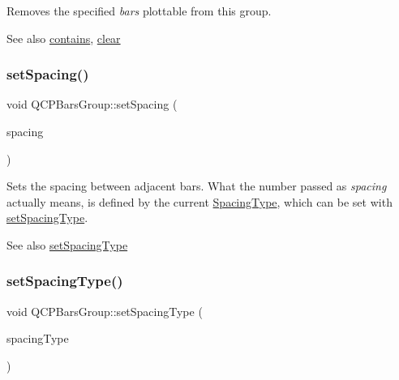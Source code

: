 Removes the specified {\itshape bars} plottable from this group.

\begin{DoxySeeAlso}{See also}
\mbox{\hyperlink{class_q_c_p_bars_group_ae26da07a23553052a178fb3fae90d0dc}{contains}}, \mbox{\hyperlink{class_q_c_p_bars_group_a3ddf23928c6cd89530bd34ab7ba7b177}{clear}} 
\end{DoxySeeAlso}
\mbox{\label{class_q_c_p_bars_group_aa553d327479d72a0c3dafcc724a190e2}} 
\subsubsection{\texorpdfstring{set\+Spacing()}{setSpacing()}}
{\footnotesize\ttfamily void Q\+C\+P\+Bars\+Group\+::set\+Spacing (\begin{DoxyParamCaption}\item[{double}]{spacing }\end{DoxyParamCaption})}

Sets the spacing between adjacent bars. What the number passed as {\itshape spacing} actually means, is defined by the current \mbox{\hyperlink{class_q_c_p_bars_group_a4c0521120a97e60bbca37677a37075b6}{Spacing\+Type}}, which can be set with \mbox{\hyperlink{class_q_c_p_bars_group_a2c7e2d61b10594a4555b615e1fcaf49e}{set\+Spacing\+Type}}.

\begin{DoxySeeAlso}{See also}
\mbox{\hyperlink{class_q_c_p_bars_group_a2c7e2d61b10594a4555b615e1fcaf49e}{set\+Spacing\+Type}} 
\end{DoxySeeAlso}
\mbox{\label{class_q_c_p_bars_group_a2c7e2d61b10594a4555b615e1fcaf49e}} 
\subsubsection{\texorpdfstring{set\+Spacing\+Type()}{setSpacingType()}}
{\footnotesize\ttfamily void Q\+C\+P\+Bars\+Group\+::set\+Spacing\+Type (\begin{DoxyParamCaption}\item[{\mbox{\hyperlink{class_q_c_p_bars_group_a4c0521120a97e60bbca37677a37075b6}{Spacing\+Type}}}]{spacing\+Type }\end{DoxyParamCaption})}

